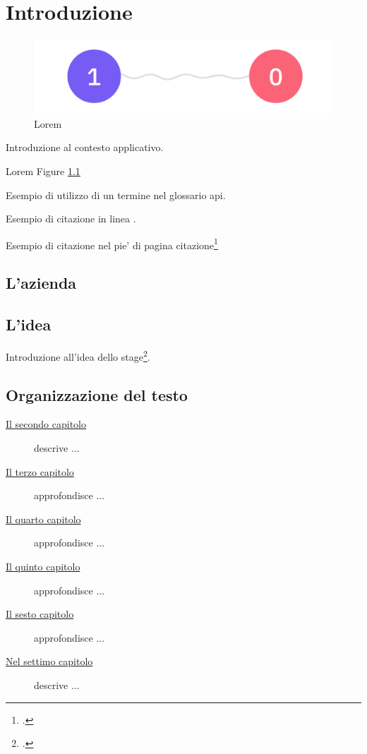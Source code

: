 \chapter{Introduzione}
\label{cap:introduzione}

\begin{figure}[h!]
    \centering
    \includegraphics[width=1\columnwidth]{img/quantum_entanglement.jpeg}
    \caption{Lorem}
    \label{fig:entanglement}
\end{figure}

Introduzione al contesto applicativo.

Lorem Figure \ref{fig:entanglement}

Esempio di utilizzo di un termine nel glossario \gls{api}.

Esempio di citazione in linea
\cite{site:agile-manifesto}.

Esempio di citazione nel pie' di pagina
citazione\footcite{womak:lean-thinking}

\lipsum[1-2]

\section{L'azienda}

\lipsum[1]

\section{L'idea}

Introduzione all'idea dello stage\footcite{article:spooky}.
\lipsum[1-3]

\section{Organizzazione del testo}

\begin{description}
    \item[{\hyperref[cap:processi-metodologie]{Il secondo capitolo}}] descrive ...
    
    \item[{\hyperref[cap:descrizione-stage]{Il terzo capitolo}}] approfondisce ...
    
    \item[{\hyperref[cap:analisi-requisiti]{Il quarto capitolo}}] approfondisce ...
    
    \item[{\hyperref[cap:progettazione-codifica]{Il quinto capitolo}}] approfondisce ...
    
    \item[{\hyperref[cap:verifica-validazione]{Il sesto capitolo}}] approfondisce ...
    
    \item[{\hyperref[cap:conclusioni]{Nel settimo capitolo}}] descrive ...
\end{description}

